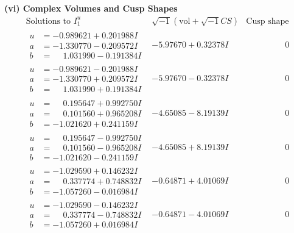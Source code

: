 \documentclass[1p]{elsarticle_modified}
\theoremstyle{definition}
\newcommand{\I}{\sqrt{-1}}
\begin{document}
\newpage\flushleft \textbf{(vi) Complex Volumes and Cusp Shapes}
$$\begin{array}{c|c|c}  
\text{Solutions to }I^u_{1}& \I (\text{vol} + \sqrt{-1}CS) & \text{Cusp shape}\\
 \hline 
\begin{aligned}
u &= -0.989621 + 0.201988 I \\
a &= -1.330770 - 0.209572 I \\
b &= \phantom{-}1.031990 - 0.191384 I\end{aligned}
 & -5.97670 + 0.32378 I & \phantom{-0.000000 } 0 \\ \hline\begin{aligned}
u &= -0.989621 - 0.201988 I \\
a &= -1.330770 + 0.209572 I \\
b &= \phantom{-}1.031990 + 0.191384 I\end{aligned}
 & -5.97670 - 0.32378 I & \phantom{-0.000000 } 0 \\ \hline\begin{aligned}
u &= \phantom{-}0.195647 + 0.992750 I \\
a &= \phantom{-}0.101560 + 0.965208 I \\
b &= -1.021620 + 0.241159 I\end{aligned}
 & -4.65085 - 8.19139 I & \phantom{-0.000000 } 0 \\ \hline\begin{aligned}
u &= \phantom{-}0.195647 - 0.992750 I \\
a &= \phantom{-}0.101560 - 0.965208 I \\
b &= -1.021620 - 0.241159 I\end{aligned}
 & -4.65085 + 8.19139 I & \phantom{-0.000000 } 0 \\ \hline\begin{aligned}
u &= -1.029590 + 0.146232 I \\
a &= \phantom{-}0.337774 + 0.748832 I \\
b &= -1.057260 - 0.016984 I\end{aligned}
 & -0.64871 + 4.01069 I & \phantom{-0.000000 } 0 \\ \hline\begin{aligned}
u &= -1.029590 - 0.146232 I \\
a &= \phantom{-}0.337774 - 0.748832 I \\
b &= -1.057260 + 0.016984 I\end{aligned}
 & -0.64871 - 4.01069 I & \phantom{-0.000000 } 0 \\ \hline\begin{aligned}

\end{aligned}
\end{array}$$
\end{document}
